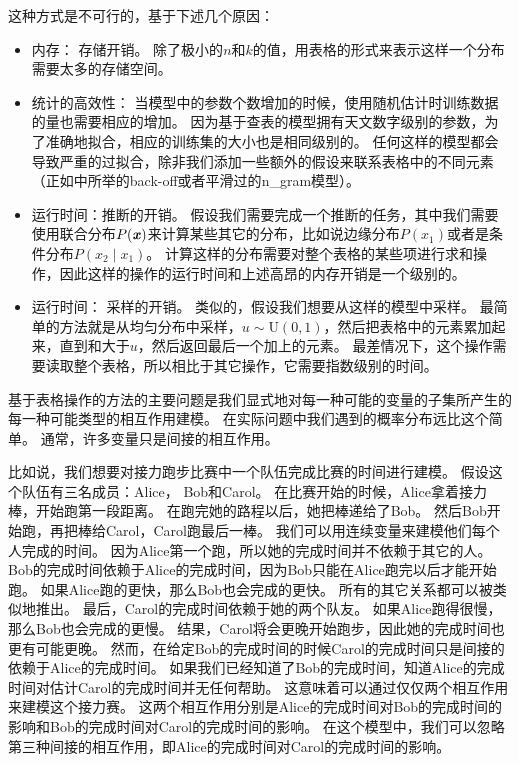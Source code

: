 这种方式是不可行的，基于下述几个原因：
\begin{itemize}
	\item 内存： 存储开销。
	除了极小的$n$和$k$的值，用表格的形式来表示这样一个分布需要太多的存储空间。
	
	\item  统计的高效性： 当模型中的参数个数增加的时候，使用随机估计时训练数据的量也需要相应的增加。
	因为基于查表的模型拥有天文数字级别的参数，为了准确地拟合，相应的训练集的大小也是相同级别的。
	任何这样的模型都会导致严重的过拟合，除非我们添加一些额外的假设来联系表格中的不同元素（正如中所举的back-off或者平滑过的\gls{n_gram}模型）。
	
	\item 运行时间：推断的开销。
	假设我们需要完成一个推断的任务，其中我们需要使用联合分布$P(\boldsymbol{\mathit{x}})$来计算某些其它的分布，比如说边缘分布$P(x_1)$或者是条件分布$P(x_2\mid x_1)$。
	计算这样的分布需要对整个表格的某些项进行求和操作，因此这样的操作的运行时间和上述高昂的内存开销是一个级别的。
	
	
	\item 运行时间： 采样的开销。
	类似的，假设我们想要从这样的模型中采样。
	最简单的方法就是从均匀分布中采样，$u\sim \text{U}(0,1)$，然后把表格中的元素累加起来，直到和大于$u$，然后返回最后一个加上的元素。
	最差情况下，这个操作需要读取整个表格，所以相比于其它操作，它需要指数级别的时间。
\end{itemize}



基于表格操作的方法的主要问题是我们显式地对每一种可能的变量的子集所产生的每一种可能类型的相互作用建模。
在实际问题中我们遇到的概率分布远比这个简单。
通常，许多变量只是间接的相互作用。


比如说，我们想要对接力跑步比赛中一个队伍完成比赛的时间进行建模。
假设这个队伍有三名成员：Alice， Bob和Carol。
在比赛开始的时候，Alice拿着接力棒，开始跑第一段距离。
在跑完她的路程以后，她把棒递给了Bob。
然后Bob开始跑，再把棒给Carol，Carol跑最后一棒。
我们可以用连续变量来建模他们每个人完成的时间。
因为Alice第一个跑，所以她的完成时间并不依赖于其它的人。
Bob的完成时间依赖于Alice的完成时间，因为Bob只能在Alice跑完以后才能开始跑。
如果Alice跑的更快，那么Bob也会完成的更快。
所有的其它关系都可以被类似地推出。
最后，Carol的完成时间依赖于她的两个队友。
如果Alice跑得很慢，那么Bob也会完成的更慢。
结果，Carol将会更晚开始跑步，因此她的完成时间也更有可能更晚。
然而，在给定Bob的完成时间的时候Carol的完成时间只是间接的依赖于Alice的完成时间。
如果我们已经知道了Bob的完成时间，知道Alice的完成时间对估计Carol的完成时间并无任何帮助。
这意味着可以通过仅仅两个相互作用来建模这个接力赛。
这两个相互作用分别是Alice的完成时间对Bob的完成时间的影响和Bob的完成时间对Carol的完成时间的影响。
在这个模型中，我们可以忽略第三种间接的相互作用，即Alice的完成时间对Carol的完成时间的影响。


